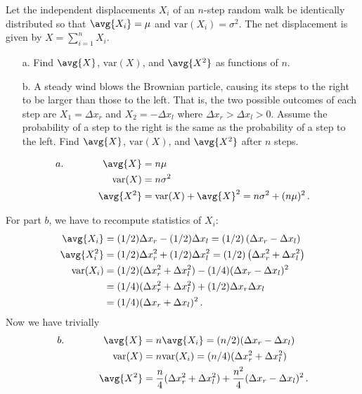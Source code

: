 

Let the independent displacements $X_i$ of an $n$-step random walk be identically distributed so that $\avg{X_i} = \mu$ and $\text{var}(X_i) = \sigma^2$.
The net displacement is given by $X = \sum_{i=1}^n X_i$.
\begin{itemize}
  \item[a.] Find $\avg{X}$, $\text{var}(X)$, and $\avg{X^2}$ as functions of $n$.
  \item[b.] A steady wind blows the Brownian particle, causing its steps to the right to be larger than those to the left.
    That is, the two possible outcomes of each step are $X_1 = \Delta x_r$ and $X_2 = -\Delta x_l$ where $\Delta x_r > \Delta x_l > 0$.
    Assume the probability of a step to the right is the same as the probability of a step to the left.
    Find $\avg{X}$, $\text{var}(X)$, and $\avg{X^2}$ after $n$ steps.
\end{itemize}


\begin{align*}
  a. \qquad \qquad
  \avg{X} &= n \mu \\
  \text{var}(X) &= n \sigma^2 \\
  \avg{X^2} &= \text{var}(X) + \avg{X}^2 = n \sigma^2 + (n\mu)^2 \, .
\end{align*}

For part $b$, we have to recompute statistics of $X_i$:
\begin{align*}
  \avg{X_i} &= (1/2) \Delta x_r - (1/2) \Delta x_l = (1/2) \left( \Delta x _r - \Delta x_l \right) \\
  \avg{X_i^2} &= (1/2) \Delta x_r^2 + (1/2) \Delta x_l^2 = (1/2) \left( \Delta x_r^2 + \Delta x_l^2 \right) \\
  \text{var}(X_i)
  &= (1/2)(\Delta x_r^2 + \Delta x_l^2 ) - (1/4)(\Delta x_r - \Delta x_l)^2 \\
  &= (1/4)(\Delta x_r^2 + \Delta x_l^2) + (1/2) \Delta x_r \Delta x_l \\
  &= (1/4)(\Delta x_r + \Delta x_l)^2 \, .
\end{align*}
Now we have trivially
\begin{align*}
  b. \qquad \qquad
  \avg{X} &= n \avg{X_i} = (n/2)(\Delta x_r - \Delta x_l) \\
  \text{var}(X) &= n \text{var}(X_i) = (n/4)(\Delta x_r^2 + \Delta x_l^2) \\
  \avg{X^2} &= \frac{n}{4} (\Delta x_r^2 + \Delta x_l^2) + \frac{n^2}{4}(\Delta x_r - \Delta x_l)^2 \, .
\end{align*}
